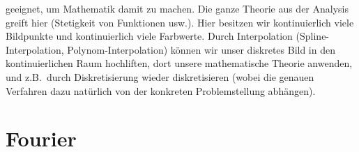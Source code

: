 \begin{description}
\begin{itemize}
      geeignet, um Mathematik damit zu machen. Die ganze Theorie aus der Analysis greift hier
      (Stetigkeit von Funktionen usw.). Hier besitzen wir kontinuierlich viele Bildpunkte und
      kontinuierlich viele Farbwerte. Durch Interpolation (Spline-Interpolation,
      Polynom-Interpolation) können wir unser diskretes Bild in den kontinuierlichen Raum 
      hochliften, dort unsere mathematische Theorie anwenden, und z.B.\ durch Diskretisierung
      wieder diskretisieren (wobei die genauen Verfahren dazu natürlich von der konkreten
      Problemstellung abhängen).
    \end{itemize}
\end{description}	

\section{Fourier}
